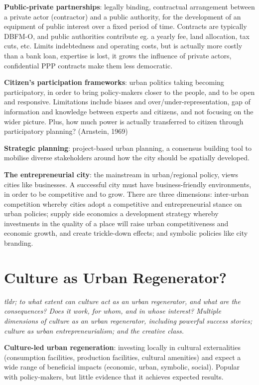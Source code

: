 \documentclass{article}
\newcommand{\alignedmarginpar}[1]{%
        \marginpar{\raggedright\small #1}
    }
\begin{document}
\textbf{Public-private partnerships}: legally binding, contractual arrangement between a private actor (contractor) and a public authority, for the development of an equipment of public interest over a fixed period of time. Contracts are typically DBFM-O, and public authorities contribute eg. a yearly fee, land allocation, tax cuts, etc. Limits indebtedness and operating costs, but is actually more costly than a bank loan, expertise is lost, it grows the influence of private actors, confidential PPP contracts make them less democratic. 

\textbf{Citizen's participation frameworks}: urban politics taking becoming participatory, in order to bring policy-makers closer to the people, and to be open and responsive. Limitations include biases and over/under-representation, gap of information and knowledge between experts and citizens, and not focusing on the wider picture. Plus, how much power is actually transferred to citizen through participatory planning? (Arnstein, 1969)

\textbf{Strategic planning}: project-based urban planning, a consensus building tool to mobilise diverse stakeholders around how the city should be spatially developed.

\textbf{The entrepreneurial city}: the mainstream in urban/regional policy, views cities like businesses. A successful city must have business-friendly environments, in order to be competitive and to grow. There are three dimensions: inter-urban competition whereby cities adopt a competitive and entrepreneurial stance on urban policies; supply side economics a development strategy whereby investments in the quality of a place will raise urban competitiveness and economic growth, and create trickle-down effects; and symbolic policies like city branding.

\pagebreak
\section{Culture as Urban Regenerator?}

\textit{tldr; to what extent can culture act as an urban regenerator, and what are the consequences? Does it work, for whom, and in whose interest? Multiple dimensions of culture as an urban regenerator, including powerful success stories; culture as urban entrepreneurialism; and the creative class.}

\alignedmarginpar{Kanal Pompidou, Roubaix}

\textbf{Culture-led urban regeneration}:\alignedmarginpar{Roubaix} investing locally in cultural externalities (consumption facilities, production facilities, cultural amenities) and expect a wide range of beneficial impacts (economic, urban, symbolic, social). Popular with policy-makers, but little evidence that it achieves expected results. 
\end{document}
